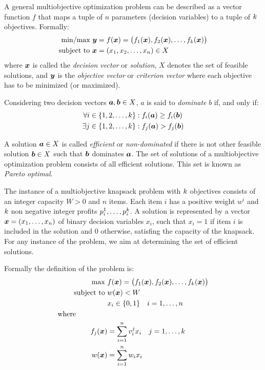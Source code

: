 A general multiobjective optimization problem can be described as a vector
function $f$ that maps a tuple of $n$ parameters (decision variables) to a tuple
of $k$ objectives.
Formally:
\begin{align*}
  \text{min/max} ~ \boldsymbol{y} &= f(\boldsymbol{x}) = 
    \big(f_1(\boldsymbol{x})
    ,f_2(\boldsymbol{x})
    ,\ldots
    ,f_{k}(\boldsymbol{x})\big) \\
  \text{subject to} ~ \boldsymbol{x} & = (x_1, x_2, \ldots, x_n) \in X
\end{align*}
where $\boldsymbol{x}$ is called the \emph{decision vector} or \emph{solution}, $X$ denotes the set
of feasible solutions, and $\boldsymbol{y}$ is the \emph{objective vector} or \emph{criterion vector} where
each objective has to be minimized (or maximized).

Considering two decision vectors $\boldsymbol{a}, \boldsymbol{b} \in X$, $a$ is said to
\emph{dominate} $b$ if, and only if:
\begin{align*}
    \forall i &\in \{1, 2, \ldots, k\}: f_i(\boldsymbol{a}) \geq f_i(\boldsymbol{b}) \\
    \exists j &\in \{1, 2, \ldots, k\}: f_j(\boldsymbol{a}) > f_j(\boldsymbol{b})
\end{align*}

A solution $\boldsymbol{a} \in X$ is called \emph{efficient} or \emph{non-dominated}
if there is not other feasible solution $\boldsymbol{b} \in X$ such that $\boldsymbol{b}$ dominates $\boldsymbol{a}$.
The set of solutions of a multiobjective optimization problem consists of all efficient solutions.
This set is known as \emph{Pareto optimal}.

The instance of a multiobjective knapsack problem with $k$
objectives consists of an integer capacity $W > 0$ and $n$ items.
Each item $i$ has a positive weight $w^i$ and $k$ non negative integer
profits $p_{i}^{1}, \ldots, p_{i}^{k}$.
A solution is represented by a vector $\boldsymbol{x} = (x_1, \ldots, x_n)$ of binary
decision variables $x_i$, such that $x_i = 1$ if item $i$ is included in the
solution and $0$ otherwise, satisfing the capacity of the knapsack.
For any instance of the problem, we aim at determining the set of efficient solutions.

Formally the definition of the problem is:
\begin{align*}
    \text{max   } & f(\boldsymbol{x}) = 
      \big(f_1(\boldsymbol{x}) ,f_2(\boldsymbol{x}) ,\ldots ,f_{k}(\boldsymbol{x})\big) \\
    \text{subject to   } & w(\boldsymbol{x}) < W \\
    & x_{i} \in \{0, 1\} \quad i = 1, \ldots, n \\
    \text{where} \phantom{mmmmm} \\
    f_j(\boldsymbol{x}) &= \sum_{i=1}^{n} v^j_i x_i \quad j = 1, \ldots, k \\
    w(\boldsymbol{x}) &= \sum_{i=1}^{n} w_i x_i
\end{align*}

